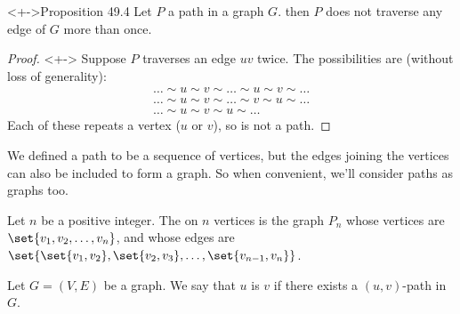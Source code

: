 \documentclass
[ignorenonframetext,aspectratio=169]
{ngelessonslides}
\begin{document}
\begin{frame}[label=path-prop]
\begin{block}<+->{Proposition 49.4}
    Let $P$ a path in a graph $G$.  then $P$ does not traverse any edge of $G$ more than once.
\end{block}
\begin{proof}<+->
Suppose $P$ traverses an edge $uv$ twice.  The possibilities are (without loss of generality):
\begin{gather*}
 \dots \sim u \sim v \sim \dots \sim u \sim v \sim \dots \\
\dots \sim u \sim v \sim \dots \sim v \sim u \sim \dots \\
\dots \sim u \sim v \sim u \sim \dots
\end{gather*}
Each of these repeats a vertex ($u$ or $v$), so is not a path.
\end{proof}
\end{frame}

\begin{frame}[label=path-graph-def]
We defined a path to be a sequence of vertices, but the edges joining the vertices
can also be included to form a graph.  So when convenient, we'll consider paths as graphs too.
\begin{definition}
    Let $n$ be a positive integer.
    The  on $n$ vertices is the graph $P_n$ whose vertices
    are $\set{v_1,v_2,\dots,v_n}$, and whose edges are
    $\set{\set{v_1,v_2},\set{v_2,v_3},\dots,\set{v_{n-1},v_n}}$.
\end{definition}
\end{frame}

\begin{frame}[label=ctdto-def]
\begin{definition}[Connected to]
    Let $G=(V,E)$ be a graph.
    We say that $u$ is  $v$ if there exists a $(u,v)$-path in $G$.
\end{definition}
\end{frame}
\end{document}
